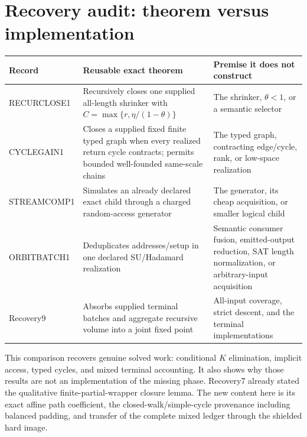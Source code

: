 \documentclass[11pt]{article}
\begin{document}
\section{Recovery audit: theorem versus implementation}

\begin{center}
\begin{tabular}{>{\raggedright\arraybackslash}p{.19\linewidth}
                >{\raggedright\arraybackslash}p{.35\linewidth}
                >{\raggedright\arraybackslash}p{.36\linewidth}}
\toprule
Record & Reusable exact theorem & Premise it does not construct\\
\midrule
RECURCLOSE1 & Recursively closes one supplied all-length shrinker with
$C=\max\{r,\eta/(1-\theta)\}$ & The shrinker, $\theta<1$, or a semantic
selector\\
CYCLEGAIN1 & Closes a supplied fixed finite typed graph when every realized
return cycle contracts; permits bounded well-founded same-scale chains & The
typed graph, contracting edge/cycle, rank, or low-space realization\\
STREAMCOMP1 & Simulates an already declared exact child through a charged
random-access generator & The generator, its cheap acquisition, or smaller
logical child\\
ORBITBATCH1 & Deduplicates addresses/setup in one declared SU/Hadamard
realization & Semantic consumer fusion, emitted-output reduction, SAT length
normalization, or arbitrary-input acquisition\\
Recovery9 & Absorbs supplied terminal batches and aggregate recursive volume
into a joint fixed point & All-input coverage, strict descent, and the
terminal implementations\\
\bottomrule
\end{tabular}
\end{center}

This comparison recovers genuine solved work: conditional $K$ elimination,
implicit access, typed cycles, and mixed terminal accounting.  It also shows
why those results are not an implementation of the missing phase.
Recovery7 already stated the qualitative finite-partial-wrapper closure
lemma.  The new content here is its exact affine path coefficient, the
closed-walk/simple-cycle provenance including balanced padding, and transfer
of the complete mixed ledger through the shielded hard image.
\end{document}
